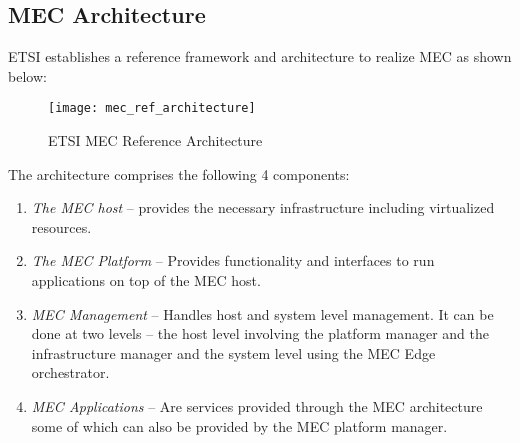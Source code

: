 \subsection{MEC Architecture}

ETSI establishes a reference framework and architecture to realize MEC as shown below:

\begin{figure}[h!]
    \centering
    \texttt{[image: mec\_ref\_architecture]}
    \label{fig:figure4}
    \caption{ETSI MEC Reference Architecture}
\end{figure}

The architecture comprises the following 4 components:
\begin{enumerate}
    \item \textit{The MEC host} – provides the necessary infrastructure including virtualized resources.
    \item \textit{The MEC Platform} – Provides functionality and interfaces to run applications on top of the MEC host.
    \item \textit{MEC Management} – Handles host and system level management. It can be done at two levels – the host level involving the platform manager and the infrastructure manager and the system level using the MEC Edge orchestrator.
    \item \textit{MEC Applications} – Are services provided through the MEC architecture some of which can also be provided by the MEC platform manager.
\end{enumerate}
